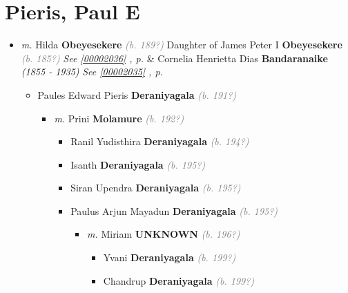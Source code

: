 \documentclass[10pt, openany]{book}
\begin{document}
\chapter{Pieris, Paul E}
\label{00001702}
\textcolor{slmaroon}{\textit{}}
\begin{itemize}
\item{\textit{m.} Hilda \textbf{Obeyesekere} \textcolor{gray}{\textit{(b. 189?)}} Daughter of  James Peter I \textbf{Obeyesekere} \textcolor{gray}{\textit{(b. 185?)}} \textcolor{slteal}{\textit{See  \autoref{00002036} \textit{, p. \pageref{00002036} }}}  \&  Cornelia Henrietta Dias \textbf{Bandaranaike} \textcolor{slorange}{\textit{(1855 - 1935)}} \textcolor{slteal}{\textit{See  \autoref{00002035} \textit{, p. \pageref{00002035} }}}   \label{couple:00001702:00001703} \begin{itemize}
\item{Paules Edward Pieris \textbf{Deraniyagala} \textcolor{gray}{\textit{(b. 191?)}}
\begin{itemize}
\item{\textit{m.} Prini \textbf{Molamure} \textcolor{gray}{\textit{(b. 192?)}}   \label{couple:00001704:00001705} \begin{itemize}
\item{Ranil Yudisthira \textbf{Deraniyagala} \textcolor{gray}{\textit{(b. 194?)}}
  }
\item{Isanth \textbf{Deraniyagala} \textcolor{gray}{\textit{(b. 195?)}}
 }
\item{Siran Upendra \textbf{Deraniyagala} \textcolor{gray}{\textit{(b. 195?)}}
  }
\item{Paulus Arjun Mayadun \textbf{Deraniyagala} \textcolor{gray}{\textit{(b. 195?)}}
\begin{itemize}
\item{\textit{m.} Miriam \textbf{UNKNOWN} \textcolor{gray}{\textit{(b. 196?)}}   \label{couple:00001706:00001707} \begin{itemize}
\item{Yvani \textbf{Deraniyagala} \textcolor{gray}{\textit{(b. 199?)}}
 }
\item{Chandrup \textbf{Deraniyagala} \textcolor{gray}{\textit{(b. 199?)}}
 }
\end{itemize}}
\end{itemize}
   }

\end{itemize}}
\end{itemize}}
\end{itemize}}
\end{itemize}
\end{document}
